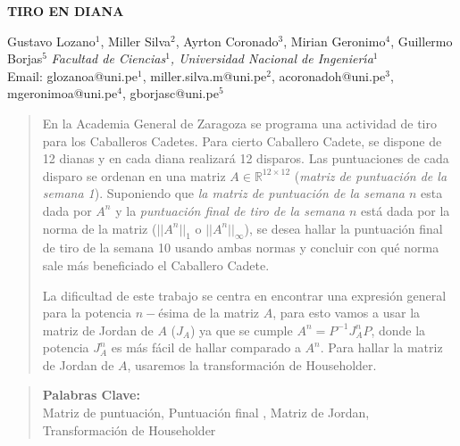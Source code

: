 \documentclass[10pt,a4paper]{article}
\begin{document}
\begin{center}
 {\Large \textbf{TIRO EN DIANA}}
\end{center}
\begin{center}
 Gustavo Lozano$^{1}$, Miller Silva$^{2}$, Ayrton Coronado$^{3}$, Mirian Geronimo$^{4}$, Guillermo Borjas$^{5}$ \vskip5pt
 {\it Facultad de Ciencias$^1$, Universidad Nacional de Ingenier\'{\i}a$^1$\\}\vskip5pt
 Email: glozanoa@uni.pe$^{1}$, miller.silva.m@uni.pe$^{2}$, acoronadoh@uni.pe$^{3}$, mgeronimoa@uni.pe$^{4}$, gborjasc@uni.pe$^{5}$
\end{center}
\vspace*{1cm}
\begin{abstract}

\noindent En la Academia General de Zaragoza se programa una actividad de tiro para los Caballeros Cadetes.
Para cierto Caballero Cadete, se dispone de 12 dianas  y en cada diana realizará 12 disparos. Las puntuaciones de cada disparo se ordenan en una matriz $A \in \mathbb{R}^{12\times 12}$ (\textit{matriz de puntuación de la semana 1}). Suponiendo que \textit{la matriz de puntuación de la semana $n$ }esta dada por $A^n$ y la \textit{puntuación final de tiro de la semana $n$ }está dada por la norma de la matriz ($||A^n||_1 \mbox{ o } ||A^n||_\infty$), se desea hallar la puntuación final de tiro de la semana 10 usando ambas normas y concluir con qué norma sale más beneficiado el Caballero Cadete.

La dificultad de este trabajo se centra en encontrar una expresión general para la potencia $n-$ésima de la matriz $A$, para esto vamos a usar la matriz de Jordan de $A$ ($J_A$) ya que se cumple $A^n=P^{-1}J^n_AP$, donde la potencia  $J^n_A$ es más fácil de hallar comparado a $A^n$. Para hallar la matriz de Jordan de $A$, usaremos la transformación de Householder.

\end{abstract}

\begin{quotation}
	{\small
		\noindent\textbf{Palabras Clave:} \\ 
	Matriz de puntuación, Puntuación final , Matriz de Jordan, Transformación de Householder\\
	}
\end{quotation}
\end{document}
